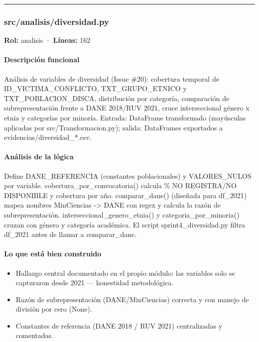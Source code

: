 \medskip
\hrule

\subsubsection{src/analisis/diversidad.py}
\textbf{Rol:} analisis · \textbf{Líneas:} 162

\paragraph{Descripción funcional}
Análisis de variables de diversidad (Issue \#20): cobertura temporal de ID\_VICTIMA\_CONFLICTO, TXT\_GRUPO\_ETNICO y TXT\_POBLACION\_DISCA, distribución por categoría, comparación de subrepresentación frente a DANE 2018/RUV 2021, cruce interseccional género x etnia y categorías por minoría. Entrada: DataFrame transformado (mayúsculas aplicadas por src/Transformacion.py); salida: DataFrames exportados a evidencias/diversidad\_*.csv.

\paragraph{Análisis de la lógica}
Define DANE\_REFERENCIA (constantes poblacionales) y VALORES\_NULOS por variable. cobertura\_por\_convocatoria() calcula \% NO REGISTRA/NO DISPONIBLE y cobertura por año. comparar\_dane() (diseñada para df\_2021) mapea nombres MinCiencias -> DANE con regex y calcula la razón de subrepresentación. interseccional\_genero\_etnia() y categoria\_por\_minoria() cruzan con género y categoría académica. El script sprint4\_diversidad.py filtra df\_2021 antes de llamar a comparar\_dane.

\paragraph{Lo que está bien construido}
\begin{itemize}
  \item Hallazgo central documentado en el propio módulo: las variables solo se capturaron desde 2021 --- honestidad metodológica.
  \item Razón de subrepresentación (DANE/MinCiencias) correcta y con manejo de división por cero (None).
  \item Constantes de referencia (DANE 2018 / RUV 2021) centralizadas y comentadas.
\end{itemize}

